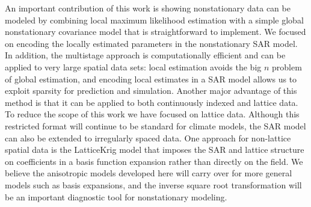 \documentclass[review]{elsarticle}
\begin{document}
An important contribution of this work is showing nonstationary data can be modeled by combining local maximum likelihood estimation with a simple global nonstationary covariance model that is straightforward to implement. We focused on encoding the locally estimated parameters in the nonstationary SAR model. In addition, the multistage approach is computationally efficient and can be applied to very large spatial data sets: local estimation avoids the big $n$ problem of global estimation, and encoding local estimates in a SAR model allows us to exploit sparsity for prediction and simulation. Another major advantage of this method is that it can be applied to both continuously indexed and lattice data. 
To reduce the scope of this work we have focused on lattice data. Although this restricted format will continue to be standard for climate models, the SAR model can also be extended to irregularly spaced data. One approach for non-lattice spatial data is the LatticeKrig model that imposes the SAR and lattice structure on coefficients in a basis function expansion rather than directly on the field.  We believe the anisotropic models developed here will carry over for more general models such as basis expansions, and the inverse square root transformation will be an important diagnostic tool for nonstationary modeling. 
 







\end{document}
